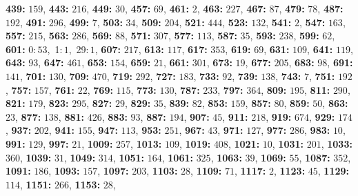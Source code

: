 \textsf{\bfseries 439:} $159$, \textsf{\bfseries 443:} $216$, \textsf{\bfseries 449:} $30$, \textsf{\bfseries 457:} $69$, \textsf{\bfseries 461:} $2$, \textsf{\bfseries 463:} $227$, \textsf{\bfseries 467:} $87$, \textsf{\bfseries 479:} $78$, \textsf{\bfseries 487:} $192$, \textsf{\bfseries 491:} $296$, \textsf{\bfseries 499:} $7$, \textsf{\bfseries 503:} $34$, \textsf{\bfseries 509:} $204$, \textsf{\bfseries 521:} $444$, \textsf{\bfseries 523:} $132$, \textsf{\bfseries 541:} $2$, \textsf{\bfseries 547:} $163$, 
\textsf{\bfseries 557:} $215$, \textsf{\bfseries 563:} $286$, \textsf{\bfseries 569:} $88$, \textsf{\bfseries 571:} $307$, \textsf{\bfseries 577:} $113$, \textsf{\bfseries 587:} $35$, \textsf{\bfseries 593:} $238$, \textsf{\bfseries 599:} $62$, \textsf{\bfseries 601:} 0:\,$53$,\ 1:\,$1$,\ 29:\,$1$, \textsf{\bfseries 607:} $217$, \textsf{\bfseries 613:} $117$, \textsf{\bfseries 617:} $353$, \textsf{\bfseries 619:} $69$, \textsf{\bfseries 631:} $109$, \textsf{\bfseries 641:} $119$, \textsf{\bfseries 643:} $93$, \textsf{\bfseries 647:} $461$, \textsf{\bfseries 653:} $154$, \textsf{\bfseries 659:} $21$, \textsf{\bfseries 661:} $301$, \textsf{\bfseries 673:} $19$, \textsf{\bfseries 677:} $205$, \textsf{\bfseries 683:} $98$, \textsf{\bfseries 691:} $141$, \textsf{\bfseries 701:} $130$, \textsf{\bfseries 709:} $470$, \textsf{\bfseries 719:} $292$, \textsf{\bfseries 727:} $183$, \textsf{\bfseries 733:} $92$, \textsf{\bfseries 739:} $138$, \textsf{\bfseries 743:} $7$, \textsf{\bfseries 751:} $192$, \textsf{\bfseries 757:} $157$, \textsf{\bfseries 761:} $22$, \textsf{\bfseries 769:} $115$, \textsf{\bfseries 773:} $130$, \textsf{\bfseries 787:} $233$, \textsf{\bfseries 797:} $364$, \textsf{\bfseries 809:} $195$, \textsf{\bfseries 811:} $290$, \textsf{\bfseries 821:} $179$, \textsf{\bfseries 823:} $295$, \textsf{\bfseries 827:} $29$, \textsf{\bfseries 829:} $35$, \textsf{\bfseries 839:} $82$, \textsf{\bfseries 853:} $159$, \textsf{\bfseries 857:} $80$, \textsf{\bfseries 859:} $50$, \textsf{\bfseries 863:} $23$, \textsf{\bfseries 877:} $138$, \textsf{\bfseries 881:} $426$, \textsf{\bfseries 883:} $93$, \textsf{\bfseries 887:} $194$, \textsf{\bfseries 907:} $45$, \textsf{\bfseries 911:} $218$, \textsf{\bfseries 919:} $674$, \textsf{\bfseries 929:} $174$, \textsf{\bfseries 937:} $202$, \textsf{\bfseries 941:} $155$, \textsf{\bfseries 947:} $113$, \textsf{\bfseries 953:} $251$, \textsf{\bfseries 967:} $43$, \textsf{\bfseries 971:} $127$, \textsf{\bfseries 977:} $286$, \textsf{\bfseries 983:} $10$, \textsf{\bfseries 991:} $129$, \textsf{\bfseries 997:} $21$, \textsf{\bfseries 1009:} $257$, \textsf{\bfseries 1013:} $109$, \textsf{\bfseries 1019:} $408$, \textsf{\bfseries 1021:} $10$, \textsf{\bfseries 1031:} $201$, \textsf{\bfseries 1033:} $360$, \textsf{\bfseries 1039:} $31$, \textsf{\bfseries 1049:} $314$, \textsf{\bfseries 1051:} $164$, \textsf{\bfseries 1061:} $325$, \textsf{\bfseries 1063:} $39$, \textsf{\bfseries 1069:} $55$, \textsf{\bfseries 1087:} $352$, \textsf{\bfseries 1091:} $186$, \textsf{\bfseries 1093:} $157$, \textsf{\bfseries 1097:} $203$, \textsf{\bfseries 1103:} $28$, \textsf{\bfseries 1109:} $71$, \textsf{\bfseries 1117:} $2$, \textsf{\bfseries 1123:} $45$, \textsf{\bfseries 1129:} $114$, \textsf{\bfseries 1151:} $266$, \textsf{\bfseries 1153:} $28$, 